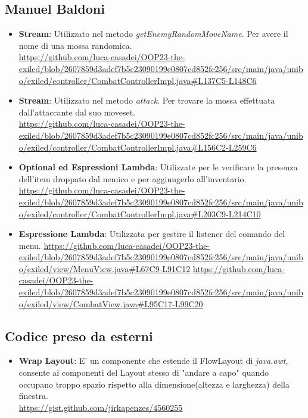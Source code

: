 \documentclass[a4paper,12pt]{report}
\begin{document}
\subsection{Manuel Baldoni}
\begin{itemize}
	\item \textbf{Stream}: Utilizzato nel metodo \textit{getEnemyRandomMoveName}. Per avere il nome di una mossa randomica.\\ \url{https://github.com/luca-casadei/OOP23-the-exiled/blob/2607859d3adef7b5c23090199e0807cd852fc256/src/main/java/unibo/exiled/controller/CombatControllerImpl.java#L137C5-L148C6}
	\item \textbf{Stream}: Utilizzato nel metodo \textit{attack}. Per trovare la mossa effettuata dall'attaccante dal suo moveset.\\ \url{https://github.com/luca-casadei/OOP23-the-exiled/blob/2607859d3adef7b5c23090199e0807cd852fc256/src/main/java/unibo/exiled/controller/CombatControllerImpl.java#L156C2-L259C6}
	\item \textbf{Optional ed Espressioni Lambda}: Utilizzate per le verificare la presenza dell'item droppato dal nemico e per aggiungerlo all'inventario.
	\url{https://github.com/luca-casadei/OOP23-the-exiled/blob/2607859d3adef7b5c23090199e0807cd852fc256/src/main/java/unibo/exiled/controller/CombatControllerImpl.java#L203C9-L214C10}
	\item \textbf{Espressione Lambda}: Utilizzata per gestire il listener del comando del menu.
	\url{https://github.com/luca-casadei/OOP23-the-exiled/blob/2607859d3adef7b5c23090199e0807cd852fc256/src/main/java/unibo/exiled/view/MenuView.java#L67C9-L91C12}
	\url{https://github.com/luca-casadei/OOP23-the-exiled/blob/2607859d3adef7b5c23090199e0807cd852fc256/src/main/java/unibo/exiled/view/CombatView.java#L95C17-L99C20}
\end{itemize}

\subsection{Codice preso da esterni}
\begin{itemize}
	\item \textbf{Wrap Layout}: E' un componente che estende il FlowLayout di \textit{java.awt}, consente ai componenti del Layout stesso di "andare a capo" quando occupano troppo spazio rispetto alla dimensione(altezza e larghezza) della finestra.\\ 
	\url{https://gist.github.com/jirkapenzes/4560255}
\end{itemize}
\end{document}

